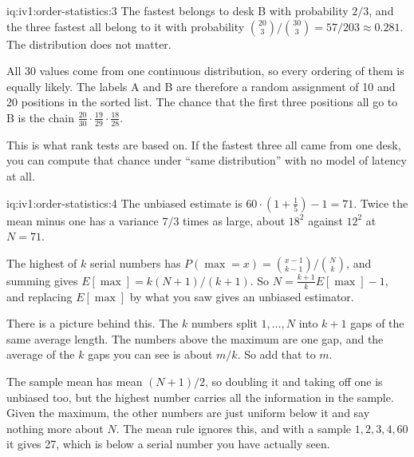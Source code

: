 \begin{solution}{iq:iv1:order-statistics:3}
The fastest belongs to desk B with probability $2/3$, and the three fastest all belong to it with probability $\binom{20}{3}/\binom{30}{3} = 57/203 \approx 0.281$. The distribution does not matter.

All 30 values come from one continuous distribution, so every ordering of them is equally likely. The labels A and B are therefore a random assignment of 10 and 20 positions in the sorted list. The chance that the first three positions all go to B is the chain $\tfrac{20}{30} \cdot \tfrac{19}{29} \cdot \tfrac{18}{28}$.

This is what rank tests are based on. If the fastest three all came from one desk, you can compute that chance under ``same distribution'' with no model of latency at all.

\end{solution}

\begin{solution}{iq:iv1:order-statistics:4}
The unbiased estimate is $60 \cdot (1 + \tfrac15) - 1 = 71$. Twice the mean minus one has a variance $7/3$ times as large, about $18^2$ against $12^2$ at $N = 71$.

The highest of $k$ serial numbers has $P(\max = x) = \binom{x - 1}{k - 1}/\binom{N}{k}$, and summing gives $E[\max] = k(N + 1)/(k + 1)$. So $N = \frac{k + 1}{k} E[\max] - 1$, and replacing $E[\max]$ by what you saw gives an unbiased estimator.

There is a picture behind this. The $k$ numbers split $1, \dots, N$ into $k + 1$ gaps of the same average length. The numbers above the maximum are one gap, and the average of the $k$ gaps you can see is about $m/k$. So add that to $m$.

The sample mean has mean $(N + 1)/2$, so doubling it and taking off one is unbiased too, but the highest number carries all the information in the sample. Given the maximum, the other numbers are just uniform below it and say nothing more about $N$. The mean rule ignores this, and with a sample $1, 2, 3, 4, 60$ it gives 27, which is below a serial number you have actually seen.

\end{solution}

